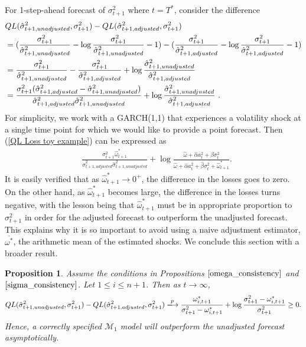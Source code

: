 \documentclass[11pt,3p,review,authoryear]{elsarticle}
\def\mc#1{\mathcal{#1}} %
\def\mc#1{\mathcal{#1}}
\newtheorem{prop}{Proposition}
\theoremstyle{definition}
\begin{document}
For 1-step-ahead forecast of $\sigma^{2}_{t+1}$ where $t=T^{*}$, consider the difference 
\begin{align}
  & QL(\hat\sigma_{t+1, unadjusted}^{2},\sigma^{2}_{t+1})-QL(\hat\sigma^{2}_{t+1, adjusted},\sigma^{2}_{t+1})\notag \\
   & =(\frac{\sigma_{t+1}^{2}}{\hat\sigma^{2}_{t+1,unadjusted}} - \log{\frac{\sigma_{t+1}^{2}}{\hat\sigma^{2}_{t+1,unadjusted}} } - 1) - (\frac{\sigma_{t+1}^{2}}{\hat\sigma^{2}_{t+1,adjusted}} - \log{\frac{\sigma_{t+1}^{2}}{\hat\sigma^{2}_{t+1,adjusted}}} - 1)\notag\\
   & = \frac{\sigma_{t+1}^{2}}{\hat\sigma^{2}_{t+1,unadjusted}} - \frac{\sigma_{t+1}^{2}}{\hat\sigma^{2}_{t+1,adjusted}}+ \log{\frac{\hat\sigma^{2}_{t+1,unadjusted}}{\hat\sigma^{2}_{t+1,adjusted}}}\notag\\
   & = \frac{\sigma_{t+1}^{2}(\hat\sigma^{2}_{t+1,adjusted}-\hat\sigma^{2}_{t+1,unadjusted})}{\hat\sigma^{2}_{t+1,adjusted}\hat\sigma^{2}_{t+1,unadjusted}} + \log{\frac{\hat\sigma^{2}_{t+1,unadjusted}}{\hat\sigma^{2}_{t+1,adjusted}}}\label{QL Loss toy example} \text{ .}
\end{align}
For simplicity, we work with a GARCH(1,1) that experiences a volatility shock at a single time point for which we would like to provide a point forecast.  Then (\ref{QL Loss toy example}) can be expressed as
\begin{align*}
   &\frac{\sigma^{2}_{t+1}\hat\omega^{*}_{t+1} }{\hat\sigma^{2}_{t+1,adjusted}\hat\sigma^{2}_{t+1,unadjusted}} + \log{\frac{\hat\omega + \hat\alpha a_{t}^{2} + \hat\beta\sigma_{t}^{2}}{\hat\omega + \hat\alpha a_{t}^{2} + \hat\beta\sigma_{t}^{2} + \hat\omega^{*}_{t+1}}}.
\end{align*}\label{QL Loss Consistency - GARCH(1,1)}
It is easily verified that as $\hat\omega^{*}_{t+1} \rightarrow 0^{+}$, the difference in the losses goes to zero.  On the other hand, as $\hat\omega^{*}_{t+1}$ becomes large, the difference in the losses turns negative, with the lesson being that $\hat\omega^{*}_{t+1}$ must be in appropriate proportion to $\sigma^{2}_{t+1}$ in order for the adjusted forecast to outperform the unadjusted forecast.  This explains why it is so important to avoid using a naive adjustment estimator, $\overline{\omega^{*}}$, the arithmetic mean of the estimated shocks.  We conclude this section with a broader result. 

\begin{prop}\label{asymptotic_consistency}
Assume the conditions in Propositions $\ref{omega_consistency}$ and $\ref{sigma_consistency}$.  Let $1\leq i\leq n+1$.  Then as $t\rightarrow \infty$,
$$QL(\hat\sigma_{t+1, unadjusted}^{2},\sigma^{2}_{t+1})-QL(\hat\sigma^{2}_{t+1, adjusted},\sigma^{2}_{t+1})\xlongrightarrow{p} \frac{\omega_{i,t+1}^{*}}{\sigma^{2}_{t+1}-\omega_{i,t+1}^{*}} + \log{\frac{\sigma_{t+1}^{2}-\omega_{i,t+1}^{*}}{\sigma_{t+1}^{2}} } \geq 0.$$
Hence, a correctly specified $\mc{M}_1$ model will outperform the unadjusted forecast asymptotically.
\end{prop}
\end{document}

